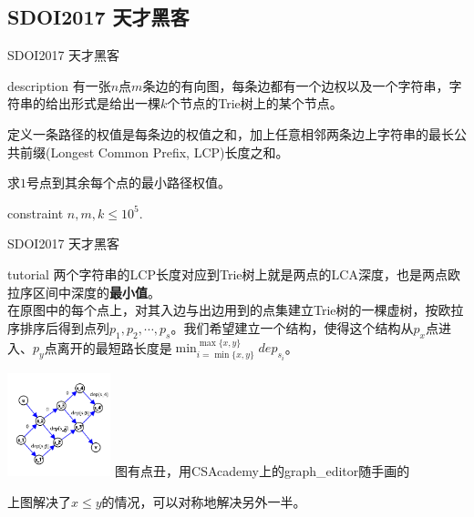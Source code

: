 \documentclass{beamer}
\begin{document}
\subsection{SDOI2017 天才黑客}
\begin{frame}{SDOI2017 天才黑客}
	\begin{block}{description}
		有一张$n$点$m$条边的有向图，每条边都有一个边权以及一个字符串，字符串的给出形式是给出一棵$k$个节点的Trie树上的某个节点。
		
		定义一条路径的权值是每条边的权值之和，加上任意相邻两条边上字符串的最长公共前缀(Longest Common Prefix, LCP)长度之和。
		
		求$1$号点到其余每个点的最小路径权值。
	\end{block}
	\begin{block}{constraint}
		$n, m, k \le 10^5.$
	\end{block}
\end{frame}
\begin{frame}{SDOI2017 天才黑客}
	\begin{block}{tutorial}
		两个字符串的LCP长度对应到Trie树上就是两点的LCA深度，也是两点欧拉序区间中深度的\textbf{最小值}。\\
		
		在原图中的每个点上，对其入边与出边用到的点集建立Trie树的一棵虚树，按欧拉序排序后得到点列$p_1, p_2, \cdots, p_s$。我们希望建立一个结构，使得这个结构从$p_x$点进入、$p_y$点离开的最短路长度是$\min_{i=\min\{x, y\}}^{\max\{x, y\}}dep_{s_i}$。
		
		\begin{center}
			\includegraphics[width=3.0cm]{hacker.png}
			{\tiny \color{gray} 图有点丑，用CSAcademy上的graph\_editor随手画的}
		\end{center}
	
		上图解决了$x \le y$的情况，可以对称地解决另外一半。
		
	\end{block}
\end{frame}
\end{document}
